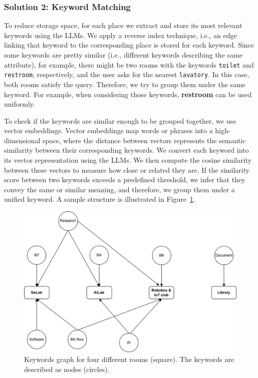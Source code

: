 \subsubsection{Solution 2: Keyword Matching}
To reduce storage space, for each place we extract and store its most relevant keywords using the LLMs. We apply a reverse index technique, i.e., an edge linking that keyword to the corresponding place is stored for each keyword. Since some keywords are pretty similar (i.e., different keywords describing the same attribute), for example, there might be two rooms with the keywords \texttt{toilet} and \texttt{restroom}, respectively, and the user asks for the nearest \texttt{lavatory}. In this case, both rooms satisfy the query. Therefore, we try to group them under the same keyword. For example, when considering those keywords, \textbf{restroom} can be used uniformly.

To check if the keywords are similar enough to be grouped together, we use vector embeddings. Vector embeddings map words or phrases into a high-dimensional space, where the distance between vectors represents the semantic similarity between their corresponding keywords. We convert each keyword into its vector representation using the LLMs. We then compute the cosine similarity between these vectors to measure how close or related they are. If the similarity score between two keywords exceeds a predefined threshold, we infer that they convey the same or similar meaning, and therefore, we group them under a unified keyword. A sample structure is illustrated in Figure~\ref{fig:data-management-1}.

\begin{figure}[ht]
  \centering
  \includegraphics[scale=0.3]{content/resources/images/chap-problems-solutions/data-management-1.png}
  \caption{Keywords graph for four different rooms (square). The keywords are described as nodes (circles).}
  \label{fig:data-management-1}
\end{figure}

